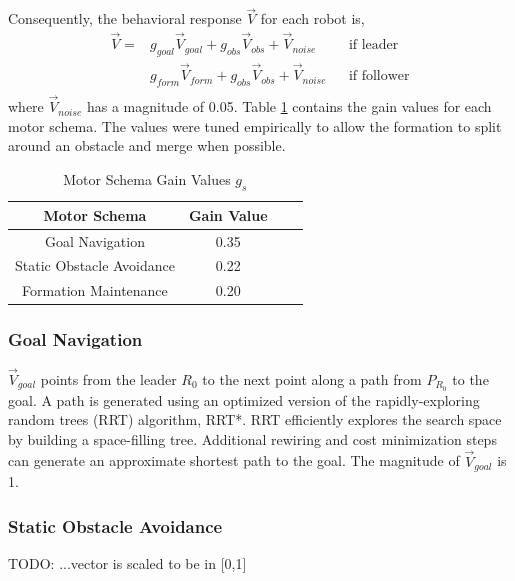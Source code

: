\documentclass[letterpaper, 10 pt, conference]{ieeeconf}  %
\begin{document}
Consequently, the behavioral response $\vec{V}$ for each robot is,
\begin{equation*}
\begin{aligned}
\vec{V} = & g_{goal} \vec{V}_{goal} + g_{obs} \vec{V}_{obs} + \vec{V}_{noise}    && \text{if leader} \\
              & g_{form} \vec{V}_{form} + g_{obs} \vec{V}_{obs} + \vec{V}_{noise}   && \text{if follower} \\
\end{aligned}
\end{equation*}
where $\vec{V}_{noise}$ has a magnitude of 0.05. Table \ref{motor_schema_gs} contains the gain values for each motor schema. The values were tuned empirically to allow the formation to split around an obstacle and merge when possible.

\begin{table}[h]
\begin{center}
\begin{tabular}{|c|c|c c|}
\hline
Motor Schema & Gain Value \\
\hline
Goal Navigation                  & 0.35 \\
Static Obstacle Avoidance    & 0.22 \\
Formation Maintenance       & 0.20 \\
\hline
\end{tabular}
\end{center}
\caption{Motor Schema Gain Values $g_s$}
\label{motor_schema_gs}
\end{table}

\subsubsection*{Goal Navigation}

$\vec{V}_{goal}$ points from the leader $R_0$ to the next point along a path from $P_{R_0}$ to the goal. A path is generated using an optimized version of the rapidly-exploring random trees (RRT) algorithm, RRT*. RRT efficiently explores the search space by building a space-filling tree. Additional rewiring and cost minimization steps can generate an approximate shortest path to the goal. The magnitude of $\vec{V}_{goal}$ is 1.

\subsubsection*{Static Obstacle Avoidance}

TODO: ...vector is scaled to be in [0,1]
\end{document}
